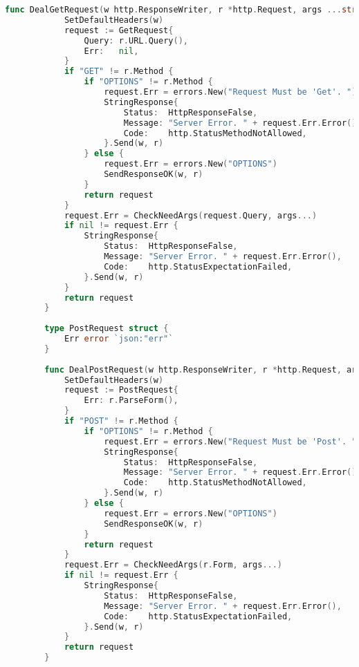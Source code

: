 \documentclass[UTF8]{ctexart}
\begin{document}
\begin{lstlisting}[language=go]
        func DealGetRequest(w http.ResponseWriter, r *http.Request, args ...string) GetRequest {
            SetDefaultHeaders(w)
            request := GetRequest{
                Query: r.URL.Query(),
                Err:   nil,
            }
            if "GET" != r.Method {
                if "OPTIONS" != r.Method {
                    request.Err = errors.New("Request Must be 'Get'. ")
                    StringResponse{
                        Status:  HttpResponseFalse,
                        Message: "Server Error. " + request.Err.Error(),
                        Code:    http.StatusMethodNotAllowed,
                    }.Send(w, r)
                } else {
                    request.Err = errors.New("OPTIONS")
                    SendResponseOK(w, r)
                }
                return request
            }
            request.Err = CheckNeedArgs(request.Query, args...)
            if nil != request.Err {
                StringResponse{
                    Status:  HttpResponseFalse,
                    Message: "Server Error. " + request.Err.Error(),
                    Code:    http.StatusExpectationFailed,
                }.Send(w, r)
            }
            return request
        }
        
        type PostRequest struct {
            Err error `json:"err"`
        }
        
        func DealPostRequest(w http.ResponseWriter, r *http.Request, args ...string) PostRequest {
            SetDefaultHeaders(w)
            request := PostRequest{
                Err: r.ParseForm(),
            }
            if "POST" != r.Method {
                if "OPTIONS" != r.Method {
                    request.Err = errors.New("Request Must be 'Post'. ")
                    StringResponse{
                        Status:  HttpResponseFalse,
                        Message: "Server Error. " + request.Err.Error(),
                        Code:    http.StatusMethodNotAllowed,
                    }.Send(w, r)
                } else {
                    request.Err = errors.New("OPTIONS")
                    SendResponseOK(w, r)
                }
                return request
            }
            request.Err = CheckNeedArgs(r.Form, args...)
            if nil != request.Err {
                StringResponse{
                    Status:  HttpResponseFalse,
                    Message: "Server Error. " + request.Err.Error(),
                    Code:    http.StatusExpectationFailed,
                }.Send(w, r)
            }
            return request
        }
        

\end{lstlisting}
\end{document}
